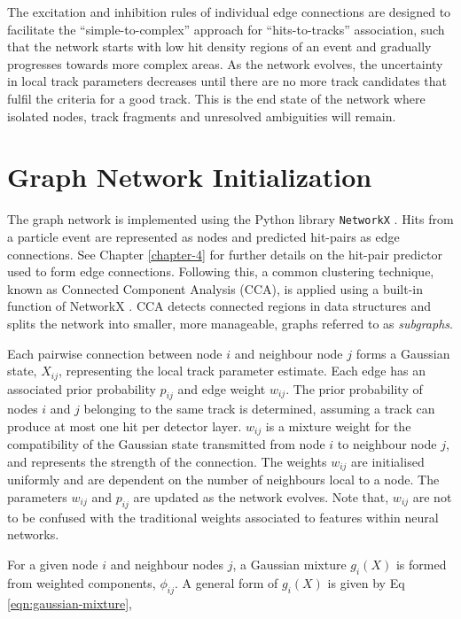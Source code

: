 The excitation and inhibition rules of individual edge connections are designed to facilitate the “simple-to-complex” approach for “hits-to-tracks” association, such that the network starts with low hit density regions of an event and gradually progresses towards more complex areas. As the network evolves, the uncertainty in local track parameters decreases until there are no more track candidates that fulfil the criteria for a good track. This is the end state of the network where isolated nodes, track fragments and unresolved ambiguities will remain.



\section{Graph Network Initialization}
\label{gnn-network-initialization}

The graph network is implemented using the Python library \texttt{NetworkX} \cite{SciPyProceedings_11}. Hits from a particle event are represented as nodes and predicted hit-pairs as edge connections. See Chapter \ref{chapter-4} for further details on the hit-pair predictor used to form edge connections. Following this, a common clustering technique, known as Connected Component Analysis (CCA), is applied using a built-in function of NetworkX \cite{networkx}. CCA detects connected regions in data structures and splits the network into smaller, more manageable, graphs referred to as \textit{subgraphs}. 

Each pairwise connection between node $i$ and neighbour node $j$ forms a Gaussian state, $X_{ij}$, representing the local track parameter estimate. Each edge has an associated prior probability $p_{ij}$ and edge weight $w_{ij}$. The prior probability of nodes $i$ and $j$ belonging to the same track is determined, assuming a track can produce at most one hit per detector layer. $w_{ij}$ is a mixture weight for the compatibility of the Gaussian state transmitted from node $i$ to neighbour node $j$, and represents the strength of the connection. The weights $w_{ij}$ are initialised uniformly and are dependent on the number of neighbours local to a node. The parameters $w_{ij}$ and $p_{ij}$ are updated as the network evolves. Note that, $w_{ij}$ are not to be confused with the traditional weights associated to features within neural networks. 

For a given node $i$ and neighbour nodes $j$, a Gaussian mixture $g_i(X)$ is formed from weighted components, $\phi_{ij}$. A general form of $g_i(X)$ is given by Eq \eqref{eqn:gaussian-mixture},



